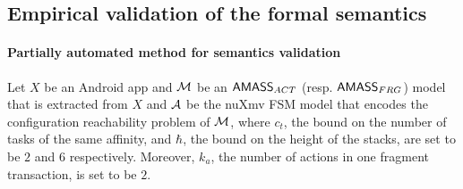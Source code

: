 \subsection{Empirical validation of the formal semantics}\label{sec:val-exp}

\paragraph*{Partially automated method for semantics validation}
%
Let $X$ be an Android app and ${\mathcal{M} }$ be an $\textsf{AMASS}_{ACT}$ (resp. $\textsf{AMASS}_{FRG}$) model that is extracted from $X$ and ${\mathcal{A} }$ be the nuXmv FSM model that encodes the configuration reachability problem of ${\mathcal{M} }$, where $c_t$, the bound on the number of tasks of the same affinity, and $\hbar$, the bound on the height of the stacks, are set to be $2$ and $6$ respectively. 
Moreover, $k_a$, the number of actions in one fragment transaction, is set to be $2$. 


